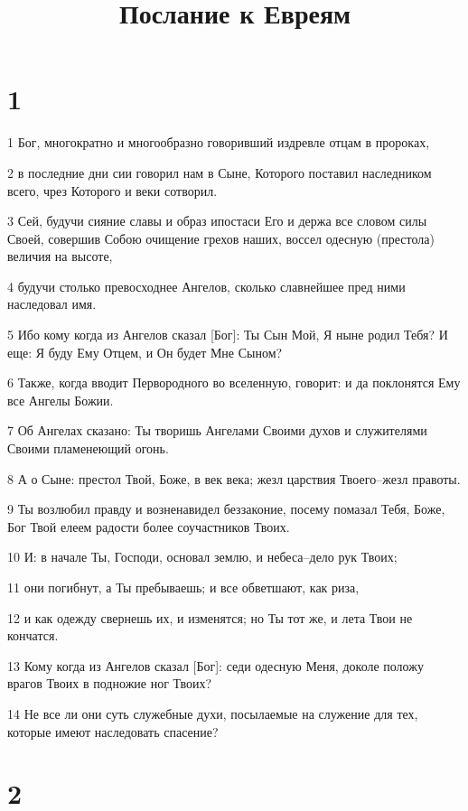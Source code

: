 

\title{Послание к Евреям}


\chapter{1}

\par 1 Бог, многократно и многообразно говоривший издревле отцам в пророках,
\par 2 в последние дни сии говорил нам в Сыне, Которого поставил наследником всего, чрез Которого и веки сотворил.
\par 3 Сей, будучи сияние славы и образ ипостаси Его и держа все словом силы Своей, совершив Собою очищение грехов наших, воссел одесную (престола) величия на высоте,
\par 4 будучи столько превосходнее Ангелов, сколько славнейшее пред ними наследовал имя.
\par 5 Ибо кому когда из Ангелов сказал [Бог]: Ты Сын Мой, Я ныне родил Тебя? И еще: Я буду Ему Отцем, и Он будет Мне Сыном?
\par 6 Также, когда вводит Первородного во вселенную, говорит: и да поклонятся Ему все Ангелы Божии.
\par 7 Об Ангелах сказано: Ты творишь Ангелами Своими духов и служителями Своими пламенеющий огонь.
\par 8 А о Сыне: престол Твой, Боже, в век века; жезл царствия Твоего--жезл правоты.
\par 9 Ты возлюбил правду и возненавидел беззаконие, посему помазал Тебя, Боже, Бог Твой елеем радости более соучастников Твоих.
\par 10 И: в начале Ты, Господи, основал землю, и небеса--дело рук Твоих;
\par 11 они погибнут, а Ты пребываешь; и все обветшают, как риза,
\par 12 и как одежду свернешь их, и изменятся; но Ты тот же, и лета Твои не кончатся.
\par 13 Кому когда из Ангелов сказал [Бог]: седи одесную Меня, доколе положу врагов Твоих в подножие ног Твоих?
\par 14 Не все ли они суть служебные духи, посылаемые на служение для тех, которые имеют наследовать спасение?

\chapter{2}

